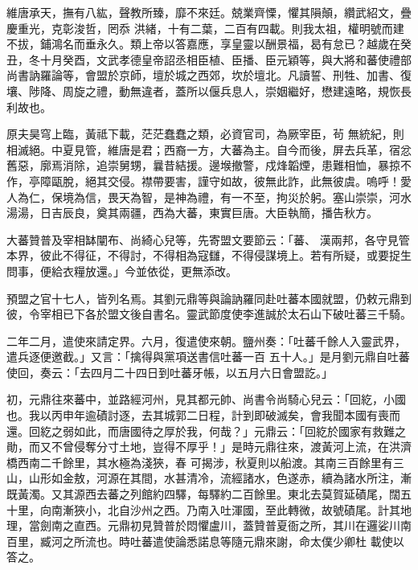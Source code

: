 \begin{pinyinscope}
 維唐承天，撫有八紘，聲教所臻，靡不來廷。兢業齊慄，懼其隕顛，纘武紹文，疊慶重光，克彰浚哲，罔忝
 洪緒，十有二葉，二百有四載。則我太祖，權明號而建不拔，鋪鴻名而垂永久。類上帝以答嘉應，享皇靈以酬景福，曷有怠已？越歲在癸丑，冬十月癸酉，文武孝德皇帝詔丞相臣植、臣播、臣元穎等，與大將和蕃使禮部尚書訥羅論等，會盟於京師，壇於城之西郊，坎於壇北。凡讀誓、刑牲、加書、復壤、陟降、周旋之禮，動無違者，蓋所以偃兵息人，崇姻繼好，懋建遠略，規恢長利故也。



 原夫昊穹上臨，黃祗下載，茫茫蠢蠢之類，必資官司，為厥宰臣，茍
 無統紀，則相滅絕。中夏見管，維唐是君；西裔一方，大蕃為主。自今而後，屏去兵革，宿忿舊惡，廓焉消除，追崇舅甥，曩昔結援。邊堠撤警，戍烽韜煙，患難相恤，暴掠不作，亭障甌脫，絕其交侵。襟帶要害，謹守如故，彼無此詐，此無彼虞。嗚呼！愛人為仁，保境為信，畏天為智，是神為禮，有一不至，拘災於躬。塞山崇崇，河水湯湯，日吉辰良，奠其兩疆，西為大蕃，東實巨唐。大臣執簡，播告秋方。



 大蕃贊普及宰相缽闡布、尚綺心兒等，先寄盟文要節云：「蕃、
 漢兩邦，各守見管本界，彼此不得征，不得討，不得相為寇讎，不得侵謀境上。若有所疑，或要捉生問事，便給衣糧放還。」今並依從，更無添改。



 預盟之官十七人，皆列名焉。其劉元鼎等與論訥羅同赴吐蕃本國就盟，仍敕元鼎到彼，令宰相已下各於盟文後自書名。靈武節度使李進誠於太石山下破吐蕃三千騎。



 二年二月，遣使來請定界。六月，復遣使來朝。鹽州奏：「吐蕃千餘人入靈武界，遣兵逐便邀截。」又言：「擒得與黨項送書信吐蕃一百
 五十人。」是月劉元鼎自吐蕃使回，奏云：「去四月二十四日到吐蕃牙帳，以五月六日會盟訖。」



 初，元鼎往來蕃中，並路經河州，見其都元帥、尚書令尚騎心兒云：「回紇，小國也。我以丙申年逾磧討逐，去其城郭二日程，計到即破滅矣，會我聞本國有喪而還。回紇之弱如此，而唐國待之厚於我，何哉？」元鼎云：「回紇於國家有救難之勛，而又不曾侵奪分寸土地，豈得不厚乎！」是時元鼎往來，渡黃河上流，在洪濟橋西南二千餘里，其水極為淺狹，春
 可揭涉，秋夏則以船渡。其南三百餘里有三山，山形如金敖，河源在其間，水甚清冷，流經諸水，色遂赤，續為諸水所注，漸既黃濁。又其源西去蕃之列館約四驛，每驛約二百餘里。東北去莫賀延磧尾，闊五十里，向南漸狹小，北自沙州之西。乃南入吐渾國，至此轉微，故號磧尾。計其地理，當劍南之直西。元鼎初見贊普於悶懼盧川，蓋贊普夏衙之所，其川在邏娑川南百里，臧河之所流也。時吐蕃遣使論悉諾息等隨元鼎來謝，命太僕少卿杜
 載使以答之。




\end{pinyinscope}
